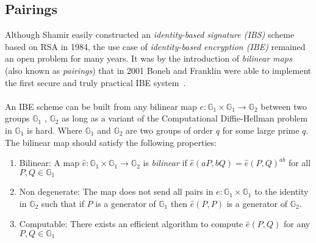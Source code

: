 \documentclass[journal]{IEEEtran}
\begin{document}
\subsection{Pairings}\label{sec:pairings}
Although Shamir easily constructed an \textit{identity-based signature (IBS)}
scheme based on RSA in 1984, the use case of \textit{identity-based encryption
(IBE)} remained an open problem for many years. It was by the introduction of
\textit{bilinear maps} (also known as \textit{pairings}) that in 2001 Boneh and
Franklin\cite{BonehFranklinIBE} were able to implement the first secure and
truly practical IBE system~\cite{Baek04asurvey}.\\
\\
An IBE scheme can be built from any bilinear map $e : \mathds{G}_1 \times
\mathds{G}_1 \rightarrow \mathds{G}_2$ between two groups $\mathds{G}_1$ ,
$\mathds{G}_2$ as long as a variant of the Computational Diffie-Hellman problem
in $\mathds{G}_1$ is hard. Where $\mathds{G}_1$ and $\mathds{G}_2$ are two
groups of order $q$ for some large prime $q$. The bilinear map should satisfy
the following properties:

\begin{enumerate}
 \item Bilinear: A map $\hat{e}: \mathds{G}_1 \times \mathds{G}_1 \rightarrow
\mathds{G}_2$ is \textit{bilinear} if $\hat{e} \left(aP,bQ \right) = \hat{e}
\left( P,Q\right)^{ab}$ for all $P,Q \in \mathds{G}_1$
 \item Non degenerate: The map does not send all pairs in $e : \mathds{G}_1
\times \mathds{G}_1$ to the identity in $\mathds{G}_2$  such that if $P$ is a
generator of $\mathds{G}_1$ then $\hat{e}\left(P,P\right)$ is a generator of
$\mathds{G}_2$.
 \item Computable: There exists an efficient algorithm to compute
$\hat{e}\left(P,Q\right)$ for any $P,Q \in \mathds{G}_1$
\end{enumerate}
\end{document}
